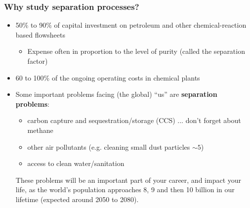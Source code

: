 \begin{frame}\frametitle{Why study separation processes?}
	\begin{itemize}
		\item	50\% to 90\% of capital investment on petroleum and other chemical-reaction based flowsheets 
		\begin{itemize}
			\item	Expense often in proportion to the level of purity (called the {\color{purple}separation factor}) 
		\end{itemize}
		\item	60 to 100\% of the ongoing operating costs in chemical plants  %
		\item	Some important problems facing (the global) ``us'' are \textbf{separation problems}:
		\begin{itemize}
			\item	carbon capture and sequestration/storage (CCS) ... don't forget about methane
			\item	other air pollutants (e.g. cleaning small dust particles $\sim 5$\micron)
			\item	access to clean water/sanitation
		\end{itemize}

		\begin{exampleblock}{}
			These problems will be an important part of your career, and impact your life, as the world's population approaches 8, 9 and then 10 billion in our lifetime (expected around 2050 to 2080).
		\end{exampleblock}

	\end{itemize}
\end{frame}

\begin{frame}\frametitle{World population: UN projections}
	\begin{center}
		\texttt{[image: \\imagedir/teaching/\{World-Population-1800-2100.png]}}
	\end{center}
\end{frame}


